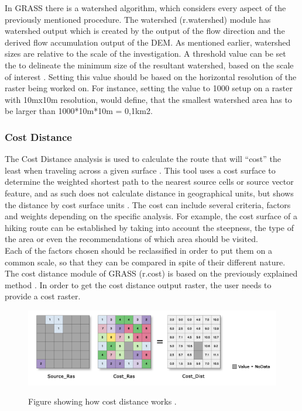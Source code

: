 In  GRASS there is a watershed algorithm, which considers every aspect of the previously mentioned procedure. The watershed (r.watershed) module has watershed output which is created by the output of the flow direction and the derived flow accumulation output of the DEM. As mentioned earlier, watershed sizes are relative to the scale of the investigation. A threshold value can be set the to delineate the minimum size of the resultant watershed, based on the scale of interest \citep{grassbook} \citep{rwatershed}. Setting this value should be based on the horizontal resolution of the raster being worked on. For instance, setting the value to 1000 setup on a raster with 10mx10m resolution, would define, that the smallest watershed area has to be larger than 1000*10m*10m = 0,1km2.

\subsubsection{Cost Distance}
The Cost Distance analysis is used to calculate the route that will “cost” the least when traveling across a given surface \citep{grassbook}. This tool uses a cost surface to determine the weighted shortest path to the nearest source cells or source vector feature, and as such does not calculate distance in geographical units, but shows the distance by cost surface units \citep{rcost}. The cost can include several criteria, factors and weights depending on the specific analysis. For example, the cost surface of a hiking route can be established by taking into account the steepness, the type of the area or even the recommendations of which area should be visited.\\
Each of the factors chosen should be reclassified in order to put them on a common scale, so that they can be compared in spite of their different nature. 
The cost distance module of GRASS (r.cost) is based on the previously explained method \citep{rcost}. In order to get the cost distance output raster, the user needs to provide a cost raster.

\begin{figure}[t]
\centering
	{\includegraphics[width=\linewidth]{gfx/COST.png}}
\caption{Figure showing how cost distance works \citep{costdistance}.}
\end{figure}

